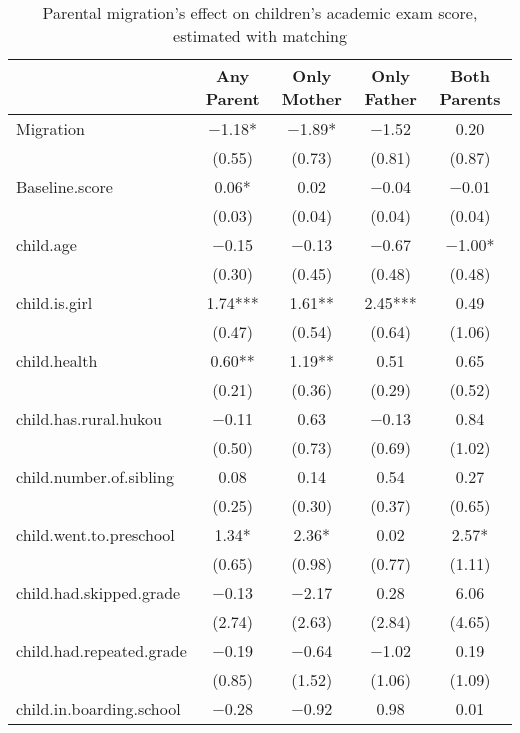 \documentclass[
  man,floatsintext]{apa7}
\begin{document}
\begin{table}

\caption{Parental migration’s effect on children’s academic exam score, estimated with matching}
\centering
\begin{tabular}[t]{lcccc}
\toprule
  & Any Parent & Only Mother & Only Father & Both Parents\\
\midrule
Migration & \num{-1.18}* & \num{-1.89}* & \num{-1.52} & \num{0.20}\\
 & (\num{0.55}) & (\num{0.73}) & (\num{0.81}) & (\num{0.87})\\
Baseline.score & \num{0.06}* & \num{0.02} & \num{-0.04} & \num{-0.01}\\
 & (\num{0.03}) & (\num{0.04}) & (\num{0.04}) & (\num{0.04})\\
child.age & \num{-0.15} & \num{-0.13} & \num{-0.67} & \num{-1.00}*\\
 & (\num{0.30}) & (\num{0.45}) & (\num{0.48}) & (\num{0.48})\\
child.is.girl & \num{1.74}*** & \num{1.61}** & \num{2.45}*** & \num{0.49}\\
 & (\num{0.47}) & (\num{0.54}) & (\num{0.64}) & (\num{1.06})\\
child.health & \num{0.60}** & \num{1.19}** & \num{0.51} & \num{0.65}\\
 & (\num{0.21}) & (\num{0.36}) & (\num{0.29}) & (\num{0.52})\\
child.has.rural.hukou & \num{-0.11} & \num{0.63} & \num{-0.13} & \num{0.84}\\
 & (\num{0.50}) & (\num{0.73}) & (\num{0.69}) & (\num{1.02})\\
child.number.of.sibling & \num{0.08} & \num{0.14} & \num{0.54} & \num{0.27}\\
 & (\num{0.25}) & (\num{0.30}) & (\num{0.37}) & (\num{0.65})\\
child.went.to.preschool & \num{1.34}* & \num{2.36}* & \num{0.02} & \num{2.57}*\\
 & (\num{0.65}) & (\num{0.98}) & (\num{0.77}) & (\num{1.11})\\
child.had.skipped.grade & \num{-0.13} & \num{-2.17} & \num{0.28} & \num{6.06}\\
 & (\num{2.74}) & (\num{2.63}) & (\num{2.84}) & (\num{4.65})\\
child.had.repeated.grade & \num{-0.19} & \num{-0.64} & \num{-1.02} & \num{0.19}\\
 & (\num{0.85}) & (\num{1.52}) & (\num{1.06}) & (\num{1.09})\\
child.in.boarding.school & \num{-0.28} & \num{-0.92} & \num{0.98} & \num{0.01}\\

\end{tabular}
\end{table}
\end{document}
